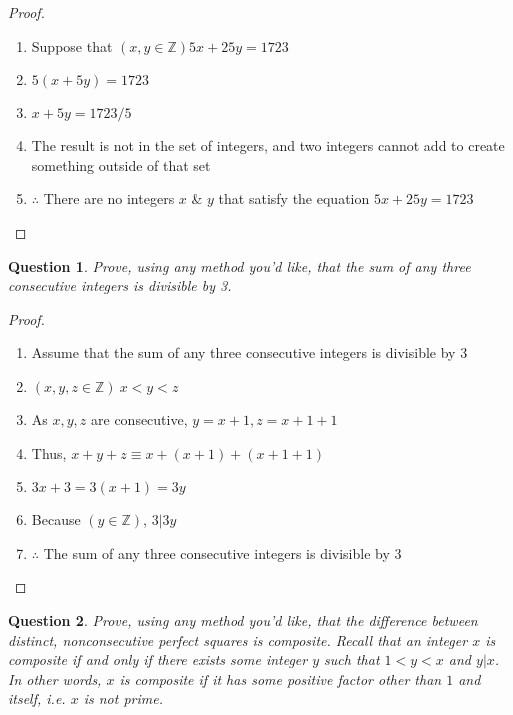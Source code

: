 \documentclass{article}
\newtheorem{question}{Question}
\begin{document}
\begin{proof}
    \begin{enumerate}
        \item Suppose that $(x, y \in \mathbb{Z}) 5x + 25y = 1723$
        \item $5(x + 5y) = 1723$
        \item $x + 5y = 1723/5$
        \item The result is not in the set of integers, and two integers cannot add to create something outside of that set
        \item $\therefore$ There are no integers $x$ \& $y$ that satisfy the equation  $5x + 25y = 1723$
    \end{enumerate}
\end{proof}

\bigskip

\begin{question}
    Prove, using any method you'd like, that the sum of any three consecutive integers is divisible by 3.
\end{question}

\begin{proof}
    \begin{enumerate}
        \item Assume that the sum of any three consecutive integers is divisible by 3
        \item $(x,y,z \in \mathbb{Z}) \  x < y < z$
        \item As $x, y, z$ are consecutive, $y = x + 1, z = x + 1 + 1$
        \item Thus, $x + y + z \equiv x + (x + 1) + (x + 1 + 1)$
        \item $3x + 3 = 3(x + 1) = 3y$
        \item Because $(y \in \mathbb{Z})$, $3|3y$
        \item $\therefore$ The sum of any three consecutive integers is divisible by 3
    \end{enumerate}
\end{proof}

\bigskip

\begin{question}
    Prove, using any method you'd like, that the difference between distinct, nonconsecutive perfect squares is composite. Recall that an integer $x$ is composite if and only if there exists some integer $y$ such that $1 < y < x$ and $y|x$. In other words, $x$ is composite if it has some positive factor other than $1$ and itself, i.e. $x$ is not prime.
\end{question}
\end{document}
